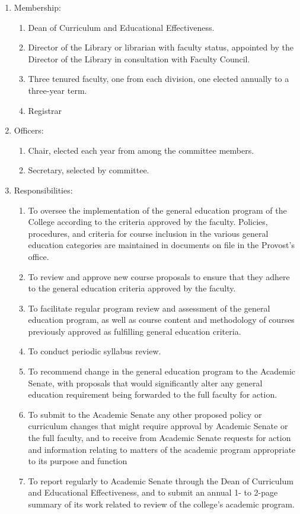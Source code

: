 \documentclass[letterpaper, 11pt]{article}
\begin{document}
					\begin{enumerate}[label=\alph*)]
						\item{Membership:
							\begin{enumerate}[label=\arabic*)]
								\item{Dean of Curriculum and Educational Effectiveness.}
								\item{Director of the Library or librarian with faculty status, appointed by the Director of the Library in consultation with Faculty Council.}
								\item{Three tenured faculty, one from each division, one elected annually to a three-year term.}
								\item{Registrar}
							\end{enumerate}
						}
						\item{Officers:
							\begin{enumerate}[label=\arabic*)]
								\item{Chair, elected each year from among the committee members.}
								\item{Secretary, selected by committee.}
							\end{enumerate}
						}
						\item{Responsibilities:
							\begin{enumerate}[label=\arabic*)]
								\item{To oversee the implementation of the general education program of the College according to the criteria approved by the faculty.  Policies, procedures, and criteria for course inclusion in the various general education categories are maintained in documents on file in the Provost's office.}
								\item{To review and approve new course proposals to ensure that they adhere to the general education criteria approved by the faculty.}
								\item{To facilitate regular program review and assessment of the general education program, as well as course content and methodology of courses previously approved as fulfilling general education criteria.}
								\item{To conduct periodic syllabus review.}
								\item{To recommend change in the general education program to the Academic Senate, with proposals that would significantly alter any general education requirement being forwarded to the full faculty for action.}
								\item{To submit to the Academic Senate any other proposed policy or curriculum changes that might require approval by Academic Senate or the full faculty, and to receive from Academic Senate requests for action and information relating to matters of the academic program appropriate to its purpose and function}
								\item{To report regularly to Academic Senate through the Dean of Curriculum and Educational Effectiveness, and to submit an annual 1- to 2-page summary of its work related to review of the college's academic program.}
							\end{enumerate}
						}
					\end{enumerate}
\end{document}
